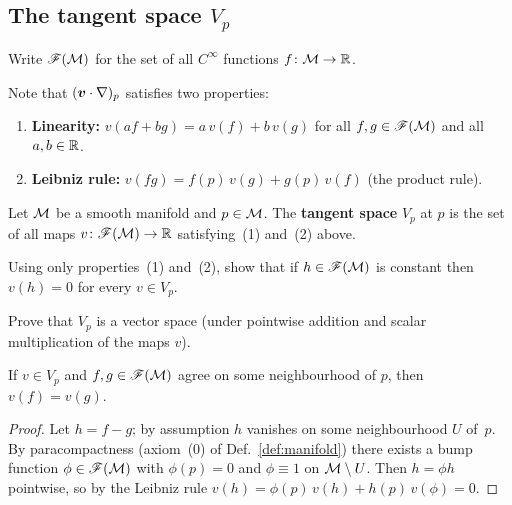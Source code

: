 \subsection{The tangent space $V_p$}\label{sec:Vp-def}

\begin{notation}
  Write $\mathscr{F}(\mathcal{M})$ for the set of all $C^\infty$ functions
  $f\colon\mathcal{M}\to\mathbb{R}$.
\end{notation}

Note that $(\boldsymbol{v}\cdot\nabla)_p$ satisfies two properties:
\begin{enumerate}
  \item \textbf{Linearity:}
    $v(af + bg) = a\,v(f) + b\,v(g)$ for all $f,g\in\mathscr{F}(\mathcal{M})$
    and all $a,b\in\mathbb{R}$.
  \item \textbf{Leibniz rule:}
    $v(fg) = f(p)\,v(g) + g(p)\,v(f)$
    \quad (the product rule).
\end{enumerate}

\begin{definition}\label{def:tangent-space}
  Let $\mathcal{M}$ be a smooth manifold and $p\in\mathcal{M}$.  The \textbf{tangent
  space} $V_p$ at $p$ is the set of all maps
  $v\colon\mathscr{F}(\mathcal{M})\to\mathbb{R}$ satisfying~(1) and~(2) above.
\end{definition}

\begin{exercise}\label{ex:const-zero}
  Using only properties~(1) and~(2), show that if
  $h\in\mathscr{F}(\mathcal{M})$ is constant then $v(h) = 0$ for every
  $v\in V_p$.
\end{exercise}

\begin{exercise}\label{ex:Vp-vector-space}
  Prove that $V_p$ is a vector space (under pointwise addition and
  scalar multiplication of the maps $v$).
\end{exercise}

\begin{lemma}\label{lem:locality}
  If $v\in V_p$ and $f,g\in\mathscr{F}(\mathcal{M})$ agree on some neighbourhood
  of $p$, then $v(f) = v(g)$.
\end{lemma}

\begin{proof}
  Let $h = f-g$; by assumption $h$ vanishes on some neighbourhood
  $U$ of~$p$.  By paracompactness (axiom~(0) of
  Def.~\ref{def:manifold}) there exists a bump function
  $\phi\in\mathscr{F}(\mathcal{M})$ with $\phi(p) = 0$ and $\phi\equiv 1$ on
  $\mathcal{M}\setminus U$.  Then $h = \phi h$ pointwise, so by the Leibniz rule
  $v(h) = \phi(p)\,v(h) + h(p)\,v(\phi) = 0$.
\end{proof}

